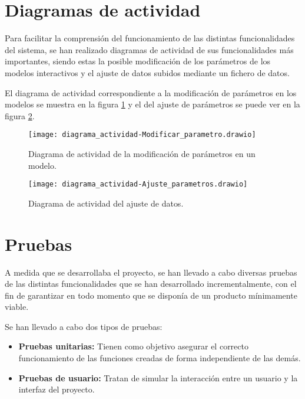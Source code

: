 \clearpage

\section{Diagramas de actividad}

Para facilitar la comprensión del funcionamiento de las distintas funcionalidades del sistema, se han realizado diagramas de actividad de sus funcionalidades más importantes, siendo estas la posible modificación de los parámetros de los modelos interactivos y el ajuste de datos subidos mediante un fichero de datos.

El diagrama de actividad correspondiente a la modificación de parámetros en los modelos se muestra en la figura \ref{diag: actividad_modificacion} y el del ajuste de parámetros se puede ver en la figura \ref{diag: actividad_ajuste}.

\begin{figure}[!h]
\begin{center}
\caption{Diagrama de actividad de la modificación de parámetros en un modelo.}
\label{diag: actividad_modificacion}
\texttt{[image: diagrama\_actividad-Modificar\_parametro.drawio]}
\end{center}
\end{figure}

\begin{figure}[!h]
\begin{center}
\caption{Diagrama de actividad del ajuste de datos.}
\label{diag: actividad_ajuste}
\texttt{[image: diagrama\_actividad-Ajuste\_parametros.drawio]}
\end{center}
\end{figure}


\section{Pruebas}

A medida que se desarrollaba el proyecto, se han llevado a cabo diversas pruebas de las distintas funcionalidades que se han desarrollado incrementalmente, con el fin de garantizar en todo momento que se disponía de un producto mínimamente viable.

Se han llevado a cabo dos tipos de pruebas:

\begin{itemize}
\item \textbf{Pruebas unitarias:} Tienen como objetivo asegurar el correcto funcionamiento de las funciones creadas de forma independiente de las demás. 
\item \textbf{Pruebas de usuario:} Tratan de simular la interacción entre un usuario y la interfaz del proyecto.
\end{itemize}

